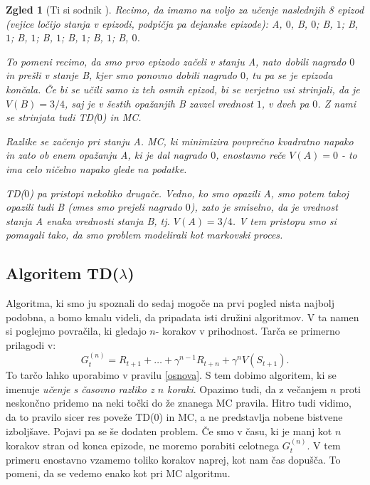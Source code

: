 \documentclass[12pt,a4paper]{amsart}
\theoremstyle{definition} %
\theoremstyle{plain} %
\newtheorem{zgled}[definicija]{Zgled}
\begin{document}
\begin{zgled}[Ti si sodnik \cite{RLintro}]
    Recimo, da imamo na voljo za učenje naslednjih 8 epizod (vejice ločijo stanja v epizodi, podpičja 
    pa dejanske epizode): 
    A, $0$, B, $0$;
    B, $1$;
    B, $1$;
    B, $1$;
    B, $1$;
    B, $1$;
    B, $1$;
    B, $0$.

    To pomeni recimo, da smo prvo epizodo začeli v stanju A, nato dobili nagrado $0$ in prešli v 
    stanje B, kjer smo ponovno dobili nagrado $0$, tu pa se je epizoda končala. Če bi se učili 
    samo iz teh osmih epizod, bi se verjetno vsi strinjali, da je $V(B) = 3/4$, saj je v šestih
    opažanjih B zavzel vrednost $1$, v dveh pa $0$. Z nami se strinjata tudi TD($0$) in MC. 

    Razlike se začenjo pri stanju A. MC, ki minimizira povprečno kvadratno napako in zato ob 
    enem opažanju A, ki je dal nagrado $0$, enostavno reče $V(A) = 0$ - to ima celo ničelno 
    napako glede na podatke. 

    TD($0$) pa pristopi nekoliko drugače. Vedno, ko smo opazili A, smo potem takoj opazili tudi B
    (vmes smo prejeli nagrado $0$), zato je smiselno, da je vrednost stanja A enaka vrednosti 
    stanja B, tj. $V(A) = 3/4$. V tem pristopu smo si pomagali tako, da smo problem modelirali kot 
    markovski proces.
\end{zgled}

\subsection{Algoritem TD($\lambda$)}
Algoritma, ki smo ju spoznali do sedaj mogoče na prvi pogled nista najbolj podobna, a bomo kmalu 
videli, da pripadata isti družini algoritmov. V ta namen si poglejmo povračila, ki gledajo $n$-
korakov v prihodnost. Tarča se primerno prilagodi v: 
$$
G_t^{(n)} = R_{t+1} + \dots + \gamma^{n-1} R_{t+n} + \gamma^n V(S_{t+1}).
$$
To tarčo lahko uporabimo v pravilu \eqref{osnova}. S tem dobimo algoritem, ki se imenuje \textit{
učenje s časovno razliko z $n$ koraki}. Opazimo tudi, da z večanjem $n$ proti neskončno pridemo na 
neki točki do že znanega MC pravila. Hitro tudi vidimo, da to pravilo sicer res poveže TD($0$) in 
MC, a ne predstavlja nobene bistvene izboljšave. Pojavi pa se še dodaten problem. Če smo v času, ki
je manj kot $n$ korakov stran od konca epizode, ne moremo porabiti celotnega $G_t^{(n)}$. V tem 
primeru enostavno vzamemo toliko korakov naprej, kot nam čas dopušča. To pomeni, da se vedemo enako 
kot pri MC algoritmu.
\end{document}
